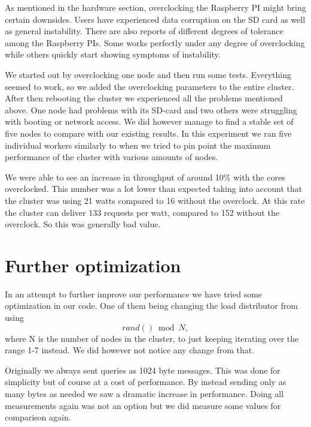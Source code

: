 As mentioned in the hardware section, overclocking the Raspberry PI might bring certain downsides. Users have experienced data corruption on the SD card as well as general instability. There are also reports of different degrees of tolerance among the Raspberry PIs. Some works perfectly under any degree of overclocking while others quickly start showing symptoms of instability.

We started out by overclocking one node and then run some tests. Everything seemed to work, so we added the overclocking parameters to the entire cluster. After then rebooting the cluster we experienced all the problems mentioned above. One node had problems with its SD-card and two others were struggling with booting or network access. We did however manage to find a stable set of five nodes to compare with our existing results. In this experiment we ran five individual workers similarly to when we tried to pin point the maximum performance of the cluster with various amounts of nodes.

We were able to see an increase in throughput of around 10\% with the cores overclocked. This number was a lot lower than expected taking into account that the cluster was using 21 watts compared to 16 without the overclock. At this rate the cluster can deliver 133 requests per watt, compared to 152 without the overclock. So this was generally bad value.


\section{Further optimization}
In an attempt to further improve our performance we have tried some optimization in our code. One of them being changing the load distributor from using $$rand() \bmod N,$$ where N is the number of nodes in the cluster, to just keeping iterating over the range 1-7 instead. We did however not notice any change from that.

Originally we always sent queries as 1024 byte messages. This was done for simplicity but of course at a cost of performance. By instead sending only as many bytes as needed we saw a dramatic increase in performance. Doing all measurements again was not an option but we did measure some values for comparison again.

















